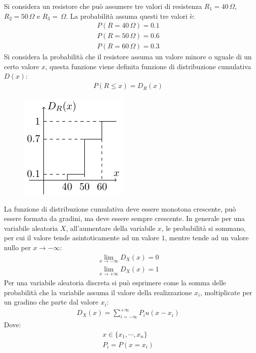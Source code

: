 \documentclass{article}
\numberwithin{equation}{subsection}
\begin{document}
Si considera un resistore che può assumere tre valori di resistenza $R_1=40\,\Omega$, $R_2=50\,\Omega$ e $R_3=\,\Omega$. La probabilità assuma questi tre valori è:
\begin{gather*}
    P(R=40\,\Omega)=0.1\\
    P(R=50\,\Omega)=0.6\\
    P(R=60\,\Omega)=0.3
\end{gather*}
Si considera la probabilità che il resistore assuma un valore minore o uguale di un certo valore $x$, questa funzione viene definita funzione di distribuzione cumulativa $D(x)$:
\begin{gather}
    P(R\leq x)=D_R(x)
\end{gather}
\begin{figure}[H]%
    \centering
    \includegraphics{distribuzione-cumulativa.pdf}%
\end{figure}

La funzione di distribuzione cumulativa deve essere monotona crescente, può essere formata da gradini, ma deve essere sempre crescente. In generale per una variabile 
aleatoria $X$, all'aumentare della variabile $x$, le probabilità si sommano, per cui il valore tende asintoticamente ad un valore $1$, mentre tende ad un valore nullo 
per $x\to-\infty$:
\begin{gather*}
    \lim_{x\to-\infty}D_X(x)=0\\
    \lim_{x\to+\infty}D_X(x)=1
\end{gather*}
Per una variabile aleatoria discreta si può esprimere come la somma delle probabilità che la variabile assuma il valore della realizzazione $x_i$, moltiplicate per un gradino 
che parte dal valore $x_i$:
\begin{gather}
    D_X(x)=\displaystyle\sum_{i=-\infty}^{+\infty}P_iu(x-x_i)
\end{gather}
Dove:
\begin{gather*}
    x\in\{x_1,\cdots,x_n\}\\
    P_i=P(x=x_i)
\end{gather*}
\end{document}
